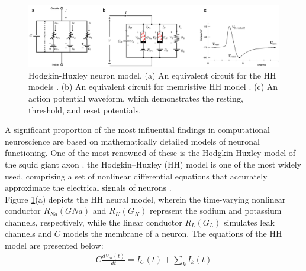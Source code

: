 

\begin{figure}[htbp!] 
    \centering    
    \includegraphics[width=1\textwidth]{Chapter1/Figs/1c.png}
    \caption[Hodgkin-Huxley neuron model.]{Hodgkin-Huxley neuron model. (a) An equivalent circuit for the HH models \cite{hodgkin1952quantitative}. (b) An equivalent circuit for memristive HH model \cite{chua2012hodgkin}. (c) An action potential waveform, which demonstrates the resting, threshold, and reset potentials. }
    \label{fig:1c}
\end{figure}

\noindent A significant proportion of the most influential findings in computational neuroscience are based on mathematically detailed models of neuronal functioning. One of the most renowned of these is the Hodgkin-Huxley model of the squid giant axon \cite{hodgkin1952quantitative}. the Hodgkin–Huxley (HH) model is one of the most widely used, comprising a set of nonlinear differential equations that accurately approximate the electrical signals of neurons \cite{chua2012hodgkin}. \\

\noindent Figure \ref{fig:1c}(a) depicts the HH neural model, wherein the time-varying nonlinear conductor $R_{Na}(GNa)$ and $R_K(G_K)$ represent the sodium and potassium channels, respectively, while the linear conductor $R_L(G_L)$ simulates leak channels and $C$ models the membrane of a neuron. The equations of the HH model are presented below: 
\begin{align}
    C \frac{dV_m(t)}{dt} = I_C(t) + \sum_{k}^{}I_k(t) \label{eq:1.1} 
\end{align}

